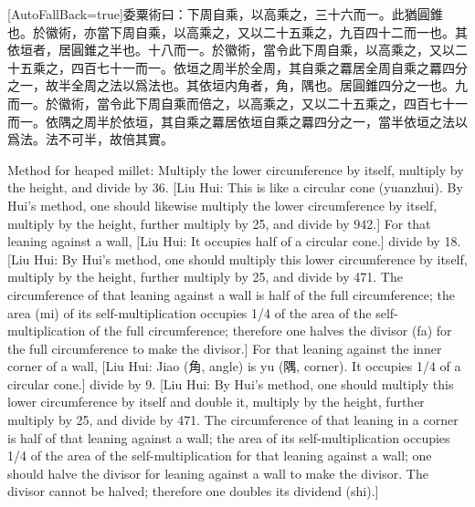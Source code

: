 \documentclass[11pt]{article}
\newcommand{\zhsmall}{\footnotesize\color{black!70}}
\newcommand{\unitlabel}[1]{\marginpar{\raggedleft\tiny\color{gray}#1}}
\newenvironment{unitzh}{\par\CJKfontspec{Noto Serif CJK SC}[AutoFallBack=true]\large\linespread{1.25}\selectfont}{\par}
\newenvironment{uniten}{\par\small\color{black!85}}{\par\medskip}
\begin{document}
\begin{unitzh}\unitlabel{jiuzhang-021.6}委粟術曰：下周自乘，以高乘之，三十六而一。{\zhsmall 此猶圓錐也。於徽術，亦當下周自乘，以高乘之，又以二十五乘之，九百四十二而一也。}其依垣者，{\zhsmall 居圓錐之半也。}十八而一。{\zhsmall 於徽術，當令此下周自乘，以高乘之，又以二十五乘之，四百七十一而一。依垣之周半於全周，其自乘之羃居全周自乘之羃四分之一，故半全周之法以爲法也。}其依垣内角者，{\zhsmall 角，隅也。居圓錐四分之一也。}九而一。{\zhsmall 於徽術，當令此下周自乘而倍之，以高乘之，又以二十五乘之，四百七十一而一。依隅之周半於依垣，其自乘之羃居依垣自乘之羃四分之一，當半依垣之法以爲法。法不可半，故倍其實。}\end{unitzh}
\begin{uniten}Method for heaped millet: Multiply the lower circumference by itself, multiply by the height, and divide by 36. [Liu Hui: This is like a circular cone (yuanzhui). By Hui's method, one should likewise multiply the lower circumference by itself, multiply by the height, further multiply by 25, and divide by 942.] For that leaning against a wall, [Liu Hui: It occupies half of a circular cone.] divide by 18. [Liu Hui: By Hui's method, one should multiply this lower circumference by itself, multiply by the height, further multiply by 25, and divide by 471. The circumference of that leaning against a wall is half of the full circumference; the area (mi) of its self-multiplication occupies 1/4 of the area of the self-multiplication of the full circumference; therefore one halves the divisor (fa) for the full circumference to make the divisor.] For that leaning against the inner corner of a wall, [Liu Hui: Jiao (角, angle) is yu (隅, corner). It occupies 1/4 of a circular cone.] divide by 9. [Liu Hui: By Hui's method, one should multiply this lower circumference by itself and double it, multiply by the height, further multiply by 25, and divide by 471. The circumference of that leaning in a corner is half of that leaning against a wall; the area of its self-multiplication occupies 1/4 of the area of the self-multiplication for that leaning against a wall; one should halve the divisor for leaning against a wall to make the divisor. The divisor cannot be halved; therefore one doubles its dividend (shi).]\end{uniten}
\end{document}
